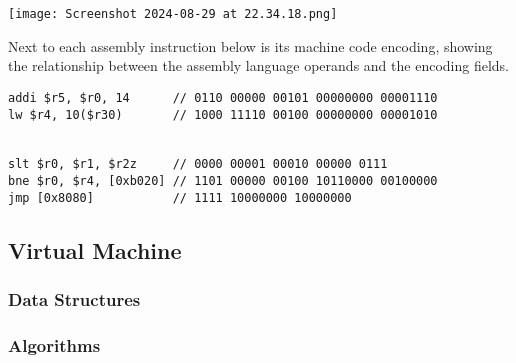 \bigskip

\begin{center}
\texttt{[image: Screenshot 2024-08-29 at 22.34.18.png]}
\end{center}

\bigskip

Next to each assembly instruction below is its machine code encoding, showing the relationship between the assembly language operands and the encoding fields. 

\begin{lstlisting}
addi $r5, $r0, 14      // 0110 00000 00101 00000000 00001110
lw $r4, 10($r30)       // 1000 11110 00100 00000000 00001010


slt $r0, $r1, $r2z     // 0000 00001 00010 00000 0111 
bne $r0, $r4, [0xb020] // 1101 00000 00100 10110000 00100000
jmp [0x8080]           // 1111 10000000 10000000
\end{lstlisting}

\subsection{Virtual Machine}
\subsubsection{Data Structures}
\subsubsection{Algorithms}
